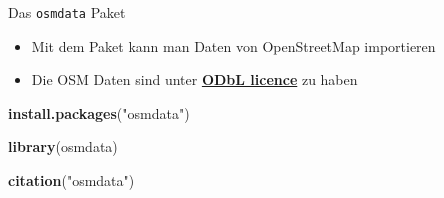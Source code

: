 \documentclass[ignorenonframetext,]{beamer}
\newenvironment{Shaded}{\begin{snugshade}}{\end{snugshade}}
\newcommand{\KeywordTok}[1]{\textcolor[rgb]{0.13,0.29,0.53}{\textbf{#1}}}
\newcommand{\NormalTok}[1]{#1}
\newcommand{\StringTok}[1]{\textcolor[rgb]{0.31,0.60,0.02}{#1}}
\providecommand{\tightlist}{%
  \setlength{\itemsep}{0pt}\setlength{\parskip}{0pt}}
\begin{document}
\begin{frame}[fragile]{Das \texttt{osmdata} Paket}
\protect\hypertarget{das-osmdata-paket-1}{}

\begin{itemize}
\tightlist
\item
  Mit dem Paket kann man Daten von OpenStreetMap importieren
\item
  Die OSM Daten sind unter
  \href{https://www.openstreetmap.org/copyright}{\textbf{ODbL licence}}
  zu haben
\end{itemize}

\begin{Shaded}
\begin{Highlighting}[]
\KeywordTok{install.packages}\NormalTok{(}\StringTok{"osmdata"}\NormalTok{)}
\end{Highlighting}
\end{Shaded}

\begin{Shaded}
\begin{Highlighting}[]
\KeywordTok{library}\NormalTok{(osmdata)}
\end{Highlighting}
\end{Shaded}

\begin{Shaded}
\begin{Highlighting}[]
\KeywordTok{citation}\NormalTok{(}\StringTok{"osmdata"}\NormalTok{)}
\end{Highlighting}
\end{Shaded}

\end{frame}
\end{document}
